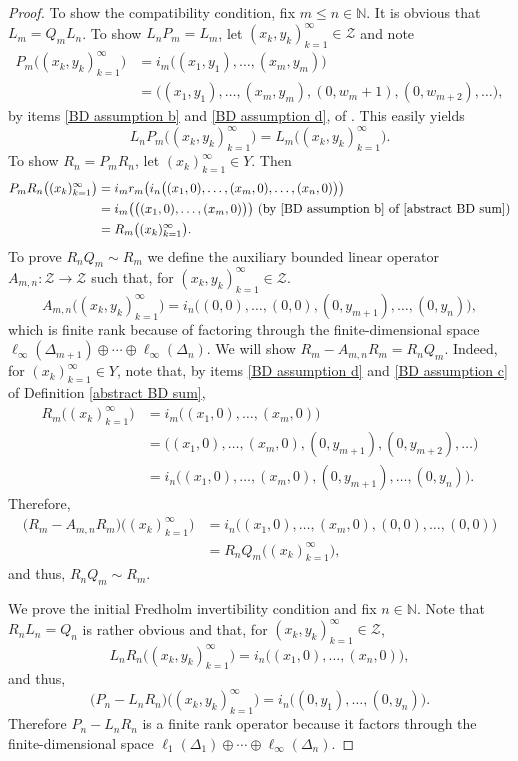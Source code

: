 \documentclass[11pt]{amsart}
\theoremstyle{definition}
\newcommand{\N}{\mathbb{N}}
\numberwithin{equation}{section}
\begin{document}
\begin{proof}
To show the compatibility condition, fix $m\leq n\in\N$. It is obvious that $L_m = Q_mL_n$. To show $L_nP_m = L_m$, let $(x_k,y_k)_{k=1}^\infty\in \mathcal{Z}$ and note 
\[
\begin{split}
P_m\big((x_k,y_k)_{k=1}^\infty\big) &= i_m\big((x_1,y_1),\ldots,(x_m,y_m)\big)\\
&= \big((x_1,y_1),\ldots,(x_m,y_m),(0,w_m+1),(0,w_{m+2}),\ldots\big),
\end{split}
\]
by items \ref{BD assumption b} and \ref{BD assumption d}, of . This easily yields
\[L_nP_m\big((x_k,y_k)_{k=1}^\infty\big) = L_m\big((x_k,y_k)_{k=1}^\infty\big).\]
To show $R_n = P_mR_n$, let $(x_k)_{k=1}^\infty\in Y$. Then
\[
\begin{split}
P_mR_n\big((x_k)_{k=1}^\infty\big) &= i_mr_m\big(i_n\big((x_1,0),\ldots,(x_m,0),\ldots,(x_n,0)\big)\big)\\
&=i_m\big(\big((x_1,0),\ldots,(x_m,0)\big)\big)\text{ (by \ref{BD assumption b} of \Cref{abstract BD sum})}\\
&=R_m\big((x_k)_{k=1}^\infty\big).
\end{split}
\]
To prove $R_nQ_m\sim R_m$ we define the auxiliary bounded linear operator $A_{m,n}:\mathcal{Z}\to\mathcal{Z}$ such that, for $(x_k,y_k)_{k=1}^\infty\in\mathcal{Z}$.
\[A_{m,n}\big((x_k,y_k)_{k=1}^\infty\big) = i_n\big((0,0),\ldots,(0,0),(0,y_{m+1}),\ldots,(0,y_n)\big),\]
which is finite rank because of factoring through the finite-dimensional space $\ell_\infty(\Delta_{m+1})\oplus\cdots\oplus\ell_\infty(\Delta_n)$. We will show $R_m - A_{m,n}R_m = R_nQ_m$. Indeed, for $(x_k)_{k=1}^\infty\in Y$, note that, by items \ref{BD assumption d} and \ref{BD assumption c} of Definition \ref{abstract BD sum},
\[
\begin{split}
R_m\big((x_k)_{k=1}^\infty\big) &= i_m\big((x_1,0),\ldots,(x_m,0)\big)\\
&= \big((x_1,0),\ldots,(x_m,0),(0,y_{m+1}),(0,y_{m+2}),\ldots\big)\\
&= i_n\big((x_1,0),\ldots,(x_m,0),(0,y_{m+1}),\ldots,(0,y_n)\big).
\end{split}
\]
Therefore,
\[
\begin{split}
\big(R_m - A_{m,n}R_m\big)\big((x_k)_{k=1}^\infty\big) &= i_n\big((x_1,0),\ldots,(x_m,0),(0,0),\ldots,(0,0)\big)\\
&= R_nQ_m\big((x_k)_{k=1}^\infty\big),
\end{split}
\]
and thus, $R_nQ_m\sim R_m$.

We prove the initial Fredholm invertibility condition and fix $n\in\N$. Note that $R_nL_n = Q_n$ is rather obvious and that, for $(x_k,y_k)_{k=1}^\infty\in\mathcal{Z}$,
\[L_nR_n\big((x_k,y_k)_{k=1}^\infty\big) = i_n\big((x_1,0),\ldots,(x_n,0)\big),\]
and thus,
\[\big(P_n - L_nR_n\big)\big((x_k,y_k)_{k=1}^\infty\big) = i_n\big((0,y_1),\ldots,(0,y_n)\big).\]
Therefore $P_n - L_nR_n$ is a finite rank operator because it factors through the finite-dimensional space $\ell_1(\Delta_1)\oplus\cdots\oplus\ell_\infty(\Delta_n)$.
\end{proof}
\end{document}
